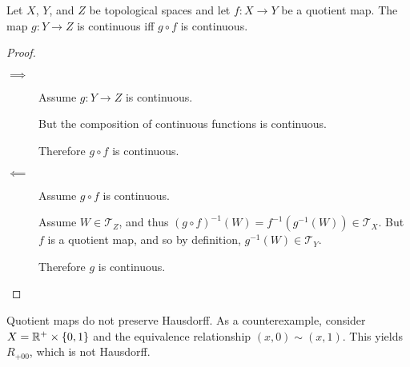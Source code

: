 \documentclass[letterpaper,12pt,fleqn]{article}
\newcommand{\T}{\mathscr{T}}
\begin{document}
\begin{theorem}
  Let \(X\), \(Y\), and \(Z\) be topological spaces and let \(f:X\to Y\) be a quotient map.  The map \(g:Y\to Z\)
  is continuous iff \(g\circ f\) is continuous.
\end{theorem}

\begin{proof}
  \begin{description}
  \item[]
  \item[\(\implies\)] Assume \(g:Y\to Z\) is continuous.

    But the composition of continuous functions is continuous.

    Therefore \(g\circ f\) is continuous.

  \item[\(\impliedby\)] Assume \(g\circ f\) is continuous.

    Assume \(W\in\T_Z\), and thus \((g\circ f)^{-1}(W)=f^{-1}(g^{-1}(W))\in\T_X\).  But \(f\) is a quotient map, and
    so by definition, \(g^{-1}(W)\in\T_Y\).

    Therefore \(g\) is continuous.
  \end{description}
\end{proof}

\begin{example}
  Quotient maps do not preserve Hausdorff.  As a counterexample, consider \(X=\mathbb{R}^+\times\{0,1\}\) and the
  equivalence relationship \((x,0)\sim(x,1)\).  This yields \(R_{+00}\), which is not Hausdorff.
\end{example}
\end{document}
